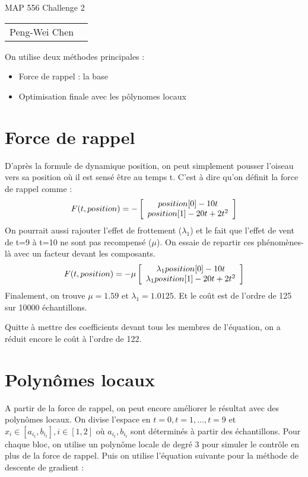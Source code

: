 \documentclass[12pt]{article}
\begin{document}
\begin{center}
    {\Large MAP 556 Challenge 2\\}
    \begin{tabular}{rl}
        Peng-Wei Chen\\
    \end{tabular}
\end{center}
On utilise deux méthodes principales :

\begin{itemize}
    \item{Force de rappel : la base}
    \item{Optimisation finale avec les pôlynomes locaux}
\end{itemize}

\section{Force de rappel}
D'après la formule de dynamique position, on peut simplement pousser l'oiseau vers sa position où il est sensé être au temps t. C'est à dire qu'on définit la force de rappel comme :
\[
    F(t, position) = -\left[
        \begin{array}[ht!]{c}
            position[0]-10t \\
            position[1]-20t+2t^2
        \end{array}
    \right]
\]
On pourrait aussi rajouter l'effet de frottement ($\lambda_1$) et le fait que l'effet de vent de t=9 à t=10 ne sont pas recompensé ($\mu$). On essaie de repartir ces phénomènes-là avec un facteur devant les composants.
\[
    F(t, position) = -\mu \left[
        \begin{array}[ht!]{c}
            \lambda_1 position[0]-10t \\
            \lambda_1 position[1]-20t+2t^2
        \end{array}
    \right]
\]
Finalement, on trouve $\mu = 1.59$ et $\lambda_1 = 1.0125$. Et le coût est de l'ordre de 125 sur 10000 échantillons.

Quitte à mettre des coefficients devant tous les membres de l'équation, on a réduit encore le coût à l'ordre de 122.

\section{Polynômes locaux}
A partir de la force de rappel, on peut encore améliorer le résultat avec des polynômes locaux. On divise l'espace en $t=0, t=1, \dots, t=9$ et $x_i \in[a_{i_t}, b_{i_t}], i\in[1, 2]$ où $a_{i_t}, b_{i_t}$ sont déterminés à partir des échantillons. 
Pour chaque bloc, on utilise un polynôme locale de degré 3 pour simuler le contrôle en plus de la force de rappel. Puis on utilise l'équation suivante pour la méthode de descente de gradient :
\end{document}
